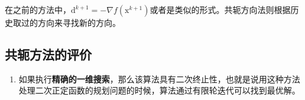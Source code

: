 \documentclass[a4paper]{D:/repositories/MyDGP/latex/PaperReadingLog}
\begin{document}
在之前的方法中，$\mathrm{d}^{k+1}=-\nabla f(\mathrm{x}^{k+1})$或者是类似的形式。共轭方向法则根据历史取过的方向来寻找新的方向。

\subsection{共轭方法的评价}
\begin{enumerate}
	\item 如果执行\textbf{精确的一维搜索}，那么该算法具有二次终止性，也就是说用这种方法处理二次正定函数的规划问题的时候，算法通过有限轮迭代可以找到最优解。
\end{enumerate}
\end{document}
